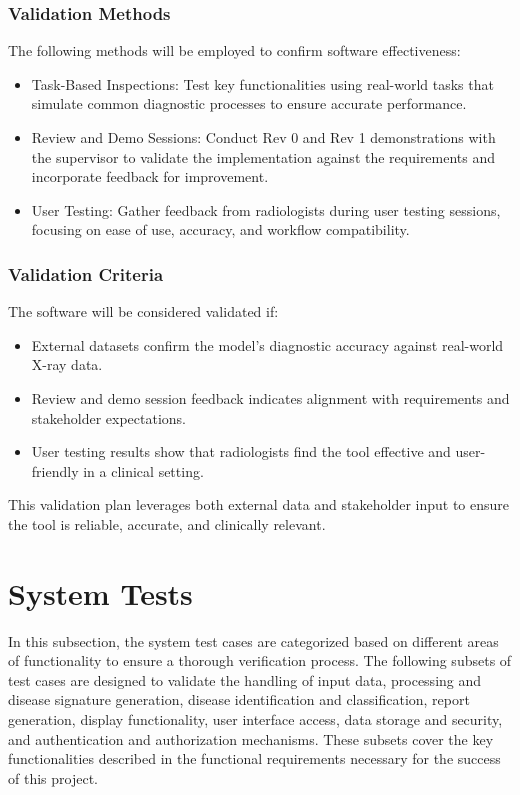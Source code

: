 \documentclass[12pt, titlepage]{article}
\begin{document}
\subsubsection{Validation Methods}
The following methods will be employed to confirm software effectiveness:
\begin{itemize}
  \item Task-Based Inspections: Test key functionalities using real-world tasks that simulate common diagnostic processes to ensure accurate performance.
  \item Review and Demo Sessions: Conduct Rev 0 and Rev 1 demonstrations with the supervisor to validate the implementation against the requirements and incorporate feedback for improvement.
  \item User Testing: Gather feedback from radiologists during user testing sessions, focusing on ease of use, accuracy, and workflow compatibility.
\end{itemize}

\subsubsection{Validation Criteria}
The software will be considered validated if:
\begin{itemize}
  \item External datasets confirm the model’s diagnostic accuracy against real-world X-ray data.
  \item Review and demo session feedback indicates alignment with requirements and stakeholder expectations.
  \item User testing results show that radiologists find the tool effective and user-friendly in a clinical setting.
\end{itemize}
This validation plan leverages both external data and stakeholder input to ensure the tool is reliable, accurate, and clinically relevant.

\section{System Tests}

In this subsection, the system test cases are categorized based on different areas of
functionality to ensure a thorough verification process. The following subsets of test cases are
designed to validate the handling of input data, processing and disease signature generation,
disease identification and classification, report generation, display functionality, user
interface access, data storage and security, and authentication and authorization mechanisms.
These subsets cover the key functionalities described in the functional requirements necessary for
the success of this project.
\end{document}

